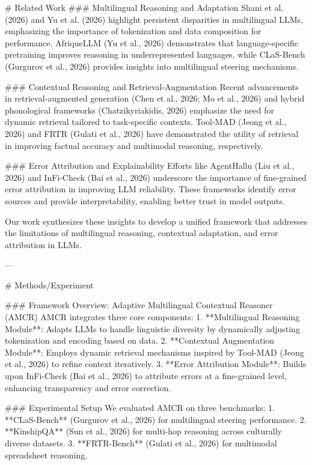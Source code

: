 # Related Work  
### Multilingual Reasoning and Adaptation  
Shani et al. (2026) and Yu et al. (2026) highlight persistent disparities in multilingual LLMs, emphasizing the importance of tokenization and data composition for performance. AfriqueLLM (Yu et al., 2026) demonstrates that language-specific pretraining improves reasoning in underrepresented languages, while CLaS-Bench (Gurgurov et al., 2026) provides insights into multilingual steering mechanisms.  

### Contextual Reasoning and Retrieval-Augmentation  
Recent advancements in retrieval-augmented generation (Chen et al., 2026; Mo et al., 2026) and hybrid phonological frameworks (Chatzikyriakidis, 2026) emphasize the need for dynamic retrieval tailored to task-specific contexts. Tool-MAD (Jeong et al., 2026) and FRTR (Gulati et al., 2026) have demonstrated the utility of retrieval in improving factual accuracy and multimodal reasoning, respectively.  

### Error Attribution and Explainability  
Efforts like AgentHallu (Liu et al., 2026) and InFi-Check (Bai et al., 2026) underscore the importance of fine-grained error attribution in improving LLM reliability. These frameworks identify error sources and provide interpretability, enabling better trust in model outputs.  

Our work synthesizes these insights to develop a unified framework that addresses the limitations of multilingual reasoning, contextual adaptation, and error attribution in LLMs.

---

# Methods/Experiment  

### Framework Overview: Adaptive Multilingual Contextual Reasoner (AMCR)  
AMCR integrates three core components:  
1. **Multilingual Reasoning Module**: Adapts LLMs to handle linguistic diversity by dynamically adjusting tokenization and encoding based on data.  
2. **Contextual Augmentation Module**: Employs dynamic retrieval mechanisms inspired by Tool-MAD (Jeong et al., 2026) to refine context iteratively.  
3. **Error Attribution Module**: Builds upon InFi-Check (Bai et al., 2026) to attribute errors at a fine-grained level, enhancing transparency and error correction.  

### Experimental Setup  
We evaluated AMCR on three benchmarks:  
1. **CLaS-Bench** (Gurgurov et al., 2026) for multilingual steering performance.  
2. **KinshipQA** (Sun et al., 2026) for multi-hop reasoning across culturally diverse datasets.  
3. **FRTR-Bench** (Gulati et al., 2026) for multimodal spreadsheet reasoning.  

